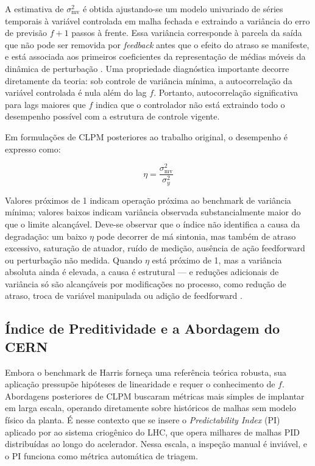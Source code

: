 A estimativa de $\sigma^2_{\text{mv}}$ é obtida ajustando-se um modelo univariado de séries temporais à variável controlada em malha fechada e extraindo a variância do erro de previsão $f+1$ passos à frente. Essa variância corresponde à parcela da saída que não pode ser removida por \textit{feedback} antes que o efeito do atraso se manifeste, e está associada aos primeiros coeficientes da representação de médias móveis da dinâmica de perturbação \cite{Harris1989}. Uma propriedade diagnóstica importante decorre diretamente da teoria: sob controle de variância mínima, a autocorrelação da variável controlada é nula além do lag $f$. Portanto, autocorrelação significativa para lags maiores que $f$ indica que o controlador não está extraindo todo o desempenho possível com a estrutura de controle vigente.

Em formulações de CLPM posteriores ao trabalho original, o desempenho é expresso como:

\begin{equation}
	\eta = \frac{\sigma^2_{\text{mv}}}{\sigma^2_y}
	\label{eq:harris_index}
\end{equation}

\noindent Valores próximos de 1 indicam operação próxima ao benchmark de variância mínima; valores baixos indicam variância observada substancialmente maior do que o limite alcançável. Deve-se observar que o índice não identifica a causa da degradação: um baixo $\eta$ pode decorrer de má sintonia, mas também de atraso excessivo, saturação de atuador, ruído de medição, ausência de ação feedforward ou perturbação não medida. Quando $\eta$ está próximo de 1, mas a variância absoluta ainda é elevada, a causa é estrutural --- e reduções adicionais de variância só são alcançáveis por modificações no processo, como redução de atraso, troca de variável manipulada ou adição de feedforward \cite{Harris1989}.

\subsection{Índice de Preditividade e a Abordagem do CERN}

Embora o benchmark de Harris forneça uma referência teórica robusta, sua aplicação pressupõe hipóteses de linearidade e requer o conhecimento de $f$. Abordagens posteriores de CLPM buscaram métricas mais simples de implantar em larga escala, operando diretamente sobre históricos de malhas sem modelo físico da planta. É nesse contexto que se insere o \textit{Predictability Index} (PI) aplicado por  ao sistema criogênico do LHC, que opera milhares de malhas PID distribuídas ao longo do acelerador. Nessa escala, a inspeção manual é inviável, e o PI funciona como métrica automática de triagem.

